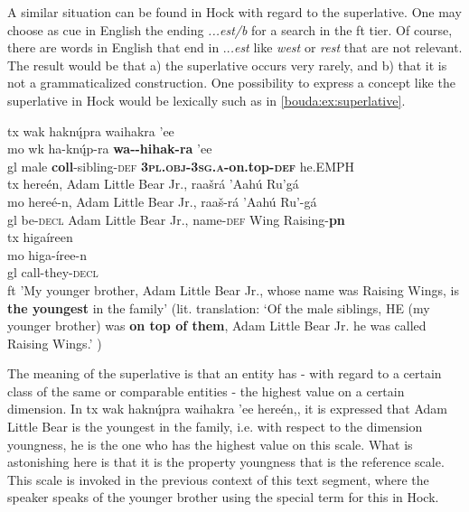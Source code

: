 A similar situation can be found in Hoc{\A}k with regard to the superlative. One may choose as cue in English the ending \textit{...est/b} for a search in the ft tier. Of course, there are words in English that end in ..\textit{.est} like \textit{west} or \textit{rest} that are not relevant. The result would be that a) the superlative occurs very rarely, and b) that it is not a grammaticalized construction. One possibility to express a concept like the superlative in Hoc{\A}k would be lexically such as in \ref{bouda:ex:superlative}.


\ea\label{bouda:ex:superlative}
\glll
tx w{\A}ak hak{\II}n{\k{\'u}}pra   waihakra                   'ee     \\
mo w{\A}k  ha-k{\II}n{\k{\'u}}p-ra \textbf{wa-{\OO}-hihak-ra} 'ee       \\
gl male \textbf{coll}-sibling-\textsc{def} \textbf{3\textsc{pl}.\textsc{obj}-\textsc{3sg.a}-on.top-\textsc{def}} he.EMPH     \\

\glll
tx here\'en{\A}, {Adam Little Bear Jr.}, raa{\v{s}}r\'a 'Aah\'u Ru'{\A}g\'a      \\
mo here\'e-n{\A}, {Adam Little Bear Jr.}, raa{\v{s}}-r\'a 'Aah\'u Ru'{\A}-g\'a \\
gl be-\textsc{decl} {Adam Little Bear Jr.}, name-\textsc{def} Wing Raising-\textbf{pn}                        \\
\glll
tx higa\'ireen{\A}\\
mo higa-\'iree-n{\A}\\
gl call-they-\textsc{decl}\\

ft 'My younger brother, Adam Little Bear Jr., whose name was Raising Wings, is \textbf{the youngest} in the family' (lit. translation: `Of the male siblings, HE (my younger brother) was \textbf{on top of them}, Adam Little Bear Jr. he was called Raising Wings.' \citep[cf.][v]{WhiteEagle1988})\\
\z

The meaning of the superlative is that an entity has - with regard to a certain class of the same or comparable entities - the highest value on a certain dimension. In tx w{\A}ak hak{\II}n{\k{\'u}}pra waihakra 'ee here\'en{\A},, it is expressed that Adam Little Bear is the youngest in the family, i.e. with respect to the dimension youngness, he is the one who has the highest value on this scale. What is astonishing here is that it is the property youngness that is the reference scale. This scale is invoked in the previous context of this text segment, where the speaker speaks of the younger brother using the special term for this in Hoc{\A}k. 

